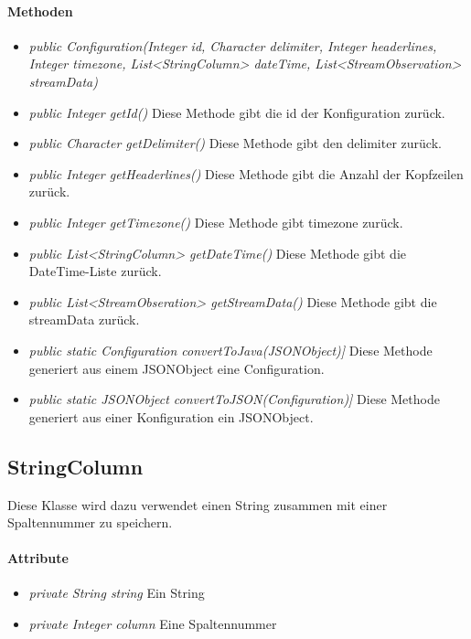 \paragraph{Methoden}
\begin{itemize}
	\item \textit{public Configuration(Integer id, Character delimiter, Integer headerlines, Integer timezone, List<StringColumn> dateTime, List<StreamObservation> streamData)}
	
	\item \textit{public Integer getId()} Diese Methode gibt die id der Konfiguration zurück.
	
	\item \textit{public Character getDelimiter()} Diese Methode gibt den delimiter zurück.
	
	\item \textit{public Integer getHeaderlines()} Diese Methode gibt die Anzahl der Kopfzeilen zurück.
	
	\item \textit{public Integer getTimezone()} Diese Methode gibt timezone zurück.	
	
	\item \textit{public List<StringColumn> getDateTime()} Diese Methode gibt die DateTime-Liste zurück.
	
	\item \textit{public List<StreamObseration> getStreamData()} Diese Methode gibt die streamData zurück.

	\item \textit{public static Configuration convertToJava(JSONObject)]} Diese Methode generiert aus einem JSONObject eine Configuration.
	
	\item \textit{public static JSONObject convertToJSON(Configuration)]} Diese Methode generiert aus einer Konfiguration ein JSONObject.
\end{itemize}


\subsection{StringColumn}
Diese Klasse wird dazu verwendet einen String zusammen mit einer Spaltennummer zu speichern.
\paragraph{Attribute}
\begin{itemize}
	\item \textit{private String string} Ein String
	\item \textit{private Integer column} Eine Spaltennummer
\end{itemize} 

